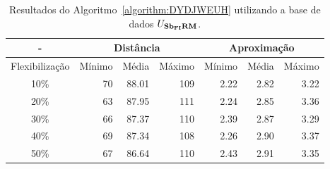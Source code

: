 \begin{table}[!htb]
  \caption{Resultados do Algoritmo~\ref{algorithm:DYDJWEUH} utilizando a base de dados $U_{\textbf{Sb\textsubscript{FI}RM}}{}$.}
  \label{table:IEBGYPHS}
  \centering
  \begin{tabular}{|c|r|r|r|r|r|r|}
    \hline
      -            & \multicolumn{3}{c|}{Distância}             & \multicolumn{3}{c|}{Aproximação}           \\ \hline
    Flexibilização & Mínimo       & Média        & Máximo       & Mínimo       & Média        & Máximo       \\ \hline  
    10\%           & 70           & 88.01        & 109          & 2.22         & 2.82         & 3.22         \\ \hline
    20\%           & 63           & 87.95        & 111          & 2.24         & 2.85         & 3.36         \\ \hline
    30\%           & 66           & 87.37        & 110          & 2.39         & 2.87         & 3.29         \\ \hline
    40\%           & 69           & 87.34        & 108          & 2.26         & 2.90         & 3.37         \\ \hline
    50\%           & 67           & 86.64        & 110          & 2.43         & 2.91         & 3.35         \\ \hline    
  \end{tabular}
\end{table}